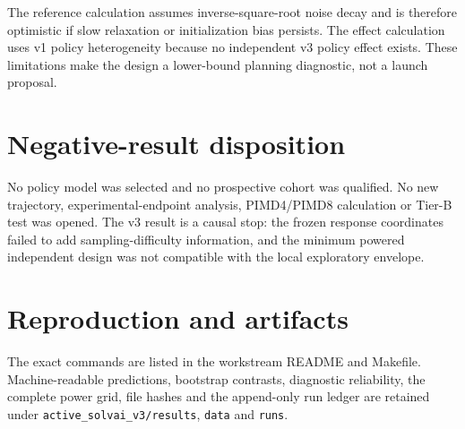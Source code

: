 \documentclass[11pt]{article}
\begin{document}
The reference calculation assumes inverse-square-root noise decay and is therefore
optimistic if slow relaxation or initialization bias persists. The effect calculation
uses v1 policy heterogeneity because no independent v3 policy effect exists. These
limitations make the design a lower-bound planning diagnostic, not a launch proposal.

\section{Negative-result disposition}

No policy model was selected and no prospective cohort was qualified. No new
trajectory, experimental-endpoint analysis, PIMD4/PIMD8 calculation or Tier-B test was
opened. The v3 result is a causal stop: the frozen response coordinates failed to add
sampling-difficulty information, and the minimum powered independent design was not
compatible with the local exploratory envelope.

\section{Reproduction and artifacts}

The exact commands are listed in the workstream README and Makefile. Machine-readable
predictions, bootstrap contrasts, diagnostic reliability, the complete power grid,
file hashes and the append-only run ledger are retained under
\texttt{active\_solvai\_v3/results}, \texttt{data} and \texttt{runs}.
\end{document}
